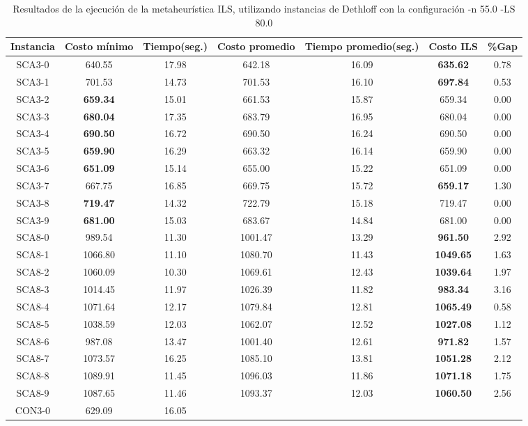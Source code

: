\begin{table}[ht]
\caption{Resultados de la ejecución de la metaheurística ILS, utilizando instancias de Dethloff con la configuración -n 55.0 -LS 80.0}
\centering
\small
\begin{tabular}{c c c c c c c}
\hline\hline
Instancia & Costo mínimo & Tiempo(seg.) & Costo promedio & Tiempo promedio(seg.) & Costo ILS & \%Gap \\ [0.5ex]
\hline
SCA3-0 & 640.55 & 17.98 & 
642.18 & 16.09 & \bf{635.62} & 
0.78\\SCA3-1 & 701.53 & 14.73 & 
701.53 & 16.10 & \bf{697.84} & 
0.53\\SCA3-2 & \bf{659.34} & 15.01 & 
661.53 & 15.87 & 659.34 & 0.00\\
SCA3-3 & \bf{680.04} & 17.35 & 
683.79 & 16.95 & 680.04 & 0.00\\
SCA3-4 & \bf{690.50} & 16.72 & 
690.50 & 16.24 & 690.50 & 0.00\\
SCA3-5 & \bf{659.90} & 16.29 & 
663.32 & 16.14 & 659.90 & 0.00\\
SCA3-6 & \bf{651.09} & 15.14 & 
655.00 & 15.22 & 651.09 & 0.00\\
SCA3-7 & 667.75 & 16.85 & 
669.75 & 15.72 & \bf{659.17} & 
1.30\\SCA3-8 & \bf{719.47} & 14.32 & 
722.79 & 15.18 & 719.47 & 0.00\\
SCA3-9 & \bf{681.00} & 15.03 & 
683.67 & 14.84 & 681.00 & 0.00\\
SCA8-0 & 989.54 & 11.30 & 
1001.47 & 13.29 & \bf{961.50} & 
2.92\\SCA8-1 & 1066.80 & 11.10 & 
1080.70 & 11.43 & \bf{1049.65} & 
1.63\\SCA8-2 & 1060.09 & 10.30 & 
1069.61 & 12.43 & \bf{1039.64} & 
1.97\\SCA8-3 & 1014.45 & 11.97 & 
1026.39 & 11.82 & \bf{983.34} & 
3.16\\SCA8-4 & 1071.64 & 12.17 & 
1079.84 & 12.81 & \bf{1065.49} & 
0.58\\SCA8-5 & 1038.59 & 12.03 & 
1062.07 & 12.52 & \bf{1027.08} & 
1.12\\SCA8-6 & 987.08 & 13.47 & 
1001.40 & 12.61 & \bf{971.82} & 
1.57\\SCA8-7 & 1073.57 & 16.25 & 
1085.10 & 13.81 & \bf{1051.28} & 
2.12\\SCA8-8 & 1089.91 & 11.45 & 
1096.03 & 11.86 & \bf{1071.18} & 
1.75\\SCA8-9 & 1087.65 & 11.46 & 
1093.37 & 12.03 & \bf{1060.50} & 
2.56\\CON3-0 & 629.09 & 16.05 & 

\end{tabular}
\end{table}
